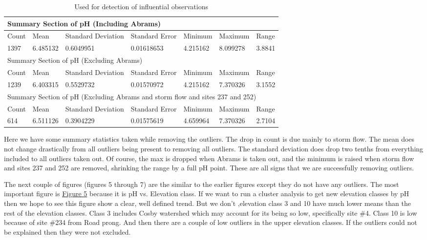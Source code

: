 \begin{table}[htbp]
\caption{Used for detection of influential observations}
\begin{tabular}{lllllll}
\toprule
\multicolumn{7}{l}{Summary Section of pH (Including Abrams)}  \\ 
\midrule
Count & Mean & Standard Deviation & Standard Error & Minimum & Maximum & Range \\ 
1397 & 6.485132 &0.6049951 & 0.01618653 &4.215162 & 8.099278 & 3.8841 \\ 
\midrule
\multicolumn{7}{l}{Summary Section of pH (Excluding Abrams)} \\ 
\midrule
Count & Mean & Standard Deviation & Standard Error & Minimum & Maximum & Range \\ 
1239 & 6.403315 & 0.5529732 & 0.01570972 & 4.215162 & 7.370326 & 3.1552 \\ 
\midrule
\multicolumn{7}{l}{Summary Section of pH (Excluding Abrams and storm flow and sites 237 and 252)}\\ 
\midrule
Count & Mean & Standard Deviation & Standard Error & Minimum & Maximum & Range \\ 
614 & 6.511126 & 0.3904229 & 0.01575619 & 4.659964 &7.370326 & 2.7104 \\ 
\bottomrule
\end{tabular}
\label{Data Summary}
\end{table}


Here we have some summary statistics taken while removing the outliers.  The drop in count is due mainly to storm flow.  The mean does not change drastically from all outliers being present to removing all outliers.  The standard deviation does drop two tenths from everything included to all outliers taken out.  Of course, the max is dropped when Abrams is taken out, and the minimum is raised when storm flow and sites 237 and 252 are removed, shrinking the range by a full pH point.  These are all signs that we are successfully removing outliers. 
    
The next couple of figures (figures 5 through 7) are the similar to the earlier figures except they do not have any outliers.  The most important figure is \hyperref[CAGraph8]{Figure 5} because it is pH vs. Elevation class.  If we want to run a cluster analysis to get new elevation classes by pH then we hope to see this figure show a clear, well defined trend.  But we don't ,elevation class 3 and 10 have much lower means than the rest of the elevation classes.  Class 3 includes Cosby watershed which may account for its being so low, specifically site $\#$4.  Class 10 is low because of site $\#$234 from Road prong.  And then there are a couple of low outliers in the upper elevation classes.  If the outliers could not be explained then they were not excluded.

